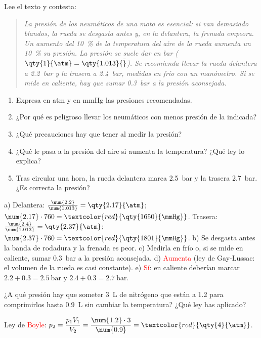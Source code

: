 \begin{exercise}
    Lee el texto y contesta:

    \begin{quote}
        \emph{La presión de los neumáticos de una moto es esencial: si van demasiado blandos, la rueda se desgasta antes y, en la delantera, la frenada empeora. Un aumento del \qty{10}{\percent} de la temperatura del aire de la rueda aumenta un \qty{10}{\percent} su presión. La presión se suele dar en bar (\(\qty{1}{\atm} = \qty{1.013}{\bar}\)). Se recomienda llevar la rueda delantera a \qty{2.2}{\bar} y la trasera a \qty{2.4}{\bar}, medidas en frío con un manómetro. Si se mide en caliente, hay que sumar \qty{0.3}{\bar} a la presión aconsejada.}
    \end{quote}

    \begin{enumerate}[label=\alph*)]
        \item Expresa en atm y en mmHg las presiones recomendadas.
        \item ¿Por qué es peligroso llevar los neumáticos con menos presión de la indicada?
        \item ¿Qué precauciones hay que tener al medir la presión?
        \item ¿Qué le pasa a la presión del aire si aumenta la temperatura? ¿Qué ley lo explica?
        \item Tras circular una hora, la rueda delantera marca \qty{2.5}{\bar} y la trasera \qty{2.7}{\bar}. ¿Es correcta la presión?
    \end{enumerate}
    \begin{solu}
        a) Delantera: \(\frac{\num{2.2}}{\num{1.013}} = \qty{2.17}{\atm}\); \(\num{2.17} \cdot 760 = \textcolor{red}{\qty{1650}{\mmHg}}\). Trasera: \(\frac{\num{2.4}}{\num{1.013}} = \qty{2.37}{\atm}\); \(\num{2.37} \cdot 760 = \textcolor{red}{\qty{1801}{\mmHg}}\).
        b) Se desgasta antes la banda de rodadura y la frenada es peor.
        c) Medirla en frío o, si se mide en caliente, sumar \qty{0.3}{\bar} a la presión aconsejada.
        d) \textcolor{red}{Aumenta} (ley de Gay-Lussac: el volumen de la rueda es casi constante).
        e) \textcolor{red}{Sí}: en caliente deberían marcar \(\num{2.2} + \num{0.3} = \qty{2.5}{\bar}\) y \(\num{2.4} + \num{0.3} = \qty{2.7}{\bar}\).
    \end{solu}
\end{exercise}

\begin{exercise}
    ¿A qué presión hay que someter \qty{3}{\L} de nitrógeno que están a \qty{1.2}{\atm} para comprimirlos hasta \qty{0.9}{\L} sin cambiar la temperatura? ¿Qué ley has aplicado?
    \begin{solu}
        Ley de \textcolor{red}{Boyle}: \(p_2 = \dfrac{p_1 V_1}{V_2} = \dfrac{\num{1.2} \cdot 3}{\num{0.9}} = \textcolor{red}{\qty{4}{\atm}}\).
    \end{solu}
\end{exercise}

